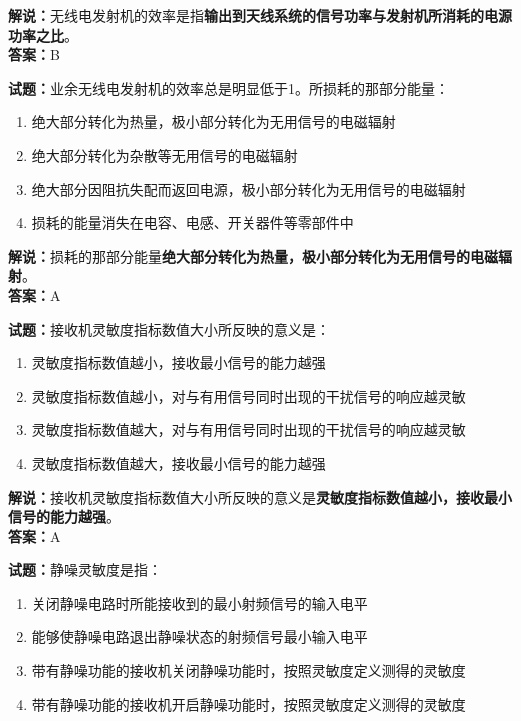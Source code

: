 \documentclass{ctexbook}
\begin{document}
\noindent\textbf{解说：}无线电发射机的效率是指\textbf{输出到天线系统的信号功率与发射机所消耗的电源功率之比}。\\\noindent\textbf{答案：}B%

\vspace{\baselineskip}

\noindent\textbf{试题：}业余无线电发射机的效率总是明显低于1。所损耗的那部分能量：

\begin{enumerate}[leftmargin=3em]
  \item 绝大部分转化为热量，极小部分转化为无用信号的电磁辐射
  \item 绝大部分转化为杂散等无用信号的电磁辐射
  \item 绝大部分因阻抗失配而返回电源，极小部分转化为无用信号的电磁辐射
  \item 损耗的能量消失在电容、电感、开关器件等零部件中
\end{enumerate}

\noindent\textbf{解说：}损耗的那部分能量\textbf{绝大部分转化为热量，极小部分转化为无用信号的电磁辐射}。\\\noindent\textbf{答案：}A%

\vspace{\baselineskip}

\noindent\textbf{试题：}接收机灵敏度指标数值大小所反映的意义是：

\begin{enumerate}[leftmargin=3em]
  \item 灵敏度指标数值越小，接收最小信号的能力越强
  \item 灵敏度指标数值越小，对与有用信号同时出现的干扰信号的响应越灵敏
  \item 灵敏度指标数值越大，对与有用信号同时出现的干扰信号的响应越灵敏
  \item 灵敏度指标数值越大，接收最小信号的能力越强
\end{enumerate}

\noindent\textbf{解说：}接收机灵敏度指标数值大小所反映的意义是\textbf{灵敏度指标数值越小，接收最小信号的能力越强}。\\\noindent\textbf{答案：}A%

\vspace{\baselineskip}

\noindent\textbf{试题：}静噪灵敏度是指：

\begin{enumerate}[leftmargin=3em]
  \item 关闭静噪电路时所能接收到的最小射频信号的输入电平
  \item 能够使静噪电路退出静噪状态的射频信号最小输入电平
  \item 带有静噪功能的接收机关闭静噪功能时，按照灵敏度定义测得的灵敏度
  \item 带有静噪功能的接收机开启静噪功能时，按照灵敏度定义测得的灵敏度
\end{enumerate}
\end{document}
